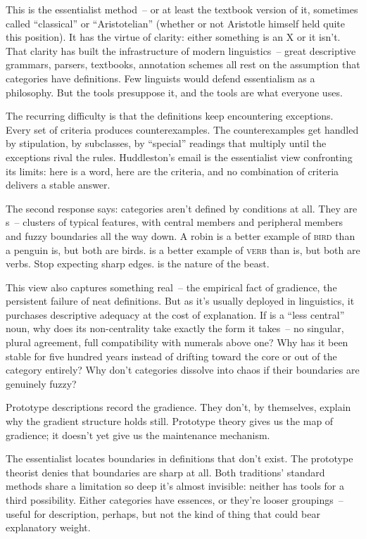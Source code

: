 This is the essentialist method~-- or at least the textbook version of it, sometimes called \enquote{classical} or \enquote{Aristotelian} (whether or not Aristotle himself held quite this position). It has the virtue of clarity: either something is an X or it isn't. That clarity has built the infrastructure of modern linguistics~-- great descriptive grammars, parsers, textbooks, annotation schemes all rest on the assumption that categories have definitions. Few linguists would defend essentialism as a philosophy. But the tools presuppose it, and the tools are what everyone uses.

The recurring difficulty is that the definitions keep encountering exceptions. Every set of criteria produces counterexamples. The counterexamples get handled by stipulation, by subclasses, by \enquote{special} readings that multiply until the exceptions rival the rules. Huddleston's email is the essentialist view confronting its limits: here is a word, here are the criteria, and no combination of criteria delivers a stable answer.

The second response says: categories aren't defined by conditions at all. They are s~-- clusters of typical features, with central members and peripheral members and fuzzy boundaries all the way down. A robin is a better example of \textsc{bird} than a penguin is, but both are birds.  is a better example of \textsc{verb} than  is, but both are verbs. Stop expecting sharp edges.  is the nature of the beast.

This view also captures something real~-- the empirical fact of gradience, the persistent failure of neat definitions. But as it's usually deployed in linguistics, it purchases descriptive adequacy at the cost of explanation. If  is a \enquote{less central} noun, why does its non-centrality take exactly the form it takes~-- no singular, plural agreement, full compatibility with numerals above one? Why has it been stable for five hundred years instead of drifting toward the core or out of the category entirely? Why don't categories dissolve into chaos if their boundaries are genuinely fuzzy?

Prototype descriptions record the gradience. They don't, by themselves, explain why the gradient structure holds still.
Prototype theory gives us the map of gradience; it doesn't yet give us the maintenance mechanism.

The essentialist locates boundaries in definitions that don't exist. The prototype theorist denies that boundaries are sharp at all. Both traditions' standard methods share a limitation so deep it's almost invisible: neither has tools for a third possibility. Either categories have essences, or they're looser groupings~-- useful for description, perhaps, but not the kind of thing that could bear explanatory weight.

